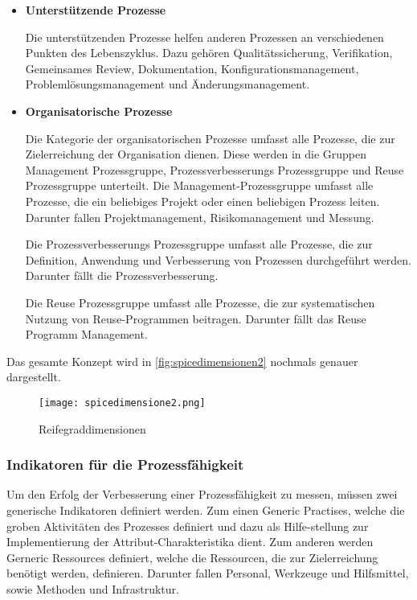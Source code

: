 \begin{itemize}
	\item \textbf{Unterstützende Prozesse} \par Die unterstützenden Prozesse helfen anderen Prozessen an verschiedenen Punkten des Lebenszyklus. Dazu gehören Qualitätssicherung, Verifikation, Gemeinsames Review, Dokumentation, Konfigurationsmanagement, Problemlösungsmanagement und Änderungsmanagement.
	\item \textbf{Organisatorische Prozesse} \par Die Kategorie der organisatorischen Prozesse umfasst alle Prozesse, die zur Zielerreichung der Organisation dienen. Diese werden in die Gruppen Management Prozessgruppe, Prozessverbesserungs Prozessgruppe und Reuse Prozessgruppe unterteilt.
  Die Management-Prozessgruppe umfasst alle Prozesse, die ein beliebiges Projekt oder einen beliebigen Prozess leiten. Darunter fallen Projektmanagement, Risikomanagement und Messung.\par
  Die Prozessverbesserungs Prozessgruppe umfasst alle Prozesse, die zur Definition, Anwendung und Verbesserung von Prozessen durchgeführt werden. Darunter fällt die Prozessverbesserung.\par
  Die Reuse Prozessgruppe umfasst alle Prozesse, die zur systematischen Nutzung von Reuse-Programmen beitragen. Darunter fällt das Reuse Programm Management.

\end{itemize}

Das gesamte Konzept wird in \autoref{fig:spicedimensionen2} nochmals genauer dargestellt.

\begin{figure}[H]
  \centering
  \caption{Reifegraddimensionen}
  \texttt{[image: spicedimensione2.png]}
  \label{fig:spicedimensionen2}
\end{figure}


\subsubsection{Indikatoren für die Prozessfähigkeit}

Um den Erfolg der Verbesserung einer Prozessfähigkeit zu messen, müssen zwei generische Indikatoren definiert werden. Zum einen Generic Practises, welche die groben Aktivitäten des Prozesses definiert und dazu als Hilfe-stellung zur Implementierung der Attribut-Charakteristika dient. Zum anderen werden Gerneric Ressources definiert, welche die Ressourcen, die zur Zielerreichung benötigt werden, definieren. Darunter fallen Personal, Werkzeuge und Hilfsmittel, sowie Methoden und Infrastruktur.

